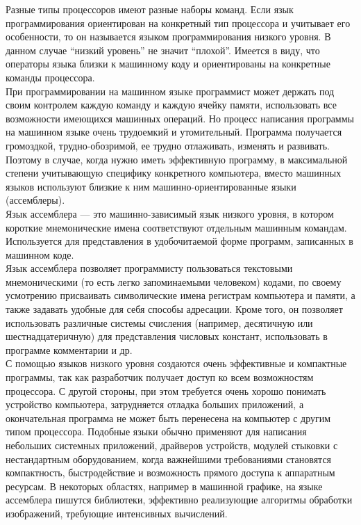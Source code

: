 Разные типы процессоров имеют разные наборы команд. Если язык программирования ориентирован на конкретный тип процессора и учитывает его особенности, то он называется языком программирования низкого уровня. В данном случае “низкий уровень” не значит “плохой”. Имеется в виду, что операторы языка близки к машинному коду и ориентированы на конкретные команды процессора. \\

При программировании на машинном языке программист может держать под своим контролем каждую команду и каждую ячейку памяти, использовать все возможности имеющихся машинных операций. Но процесс написания программы на машинном языке очень трудоемкий и утомительный. Программа получается громоздкой, трудно-обозримой, ее трудно отлаживать, изменять и развивать. \\

Поэтому в случае, когда нужно иметь эффективную программу, в максимальной степени учитывающую специфику конкретного компьютера, вместо машинных языков используют близкие к ним машинно-ориентированные языки (ассемблеры). \\

Язык ассемблера — это машинно-зависимый язык низкого уровня, в котором короткие мнемонические имена соответствуют отдельным машинным командам. Используется для представления в удобочитаемой форме программ, записанных в машинном коде. \\

Язык ассемблера позволяет программисту пользоваться текстовыми мнемоническими (то есть легко запоминаемыми человеком) кодами, по своему усмотрению присваивать символические имена регистрам компьютера и памяти, а также задавать удобные для себя способы адресации. Кроме того, он позволяет использовать различные системы счисления (например, десятичную или шестнадцатеричную) для представления числовых констант, использовать в программе комментарии и др. \\

С помощью языков низкого уровня создаются очень эффективные и компактные программы, так как разработчик получает доступ ко всем возможностям процессора. С другой стороны, при этом требуется очень хорошо понимать устройство компьютера, затрудняется отладка больших приложений, а окончательная программа не может быть перенесена на компьютер с другим типом процессора. Подобные языки обычно применяют для написания небольших системных приложений, драйверов устройств, модулей стыковки с нестандартным оборудованием, когда важнейшими требованиями становятся компактность, быстродействие и возможность прямого доступа к аппаратным ресурсам. В некоторых областях, например в машинной графике, на языке ассемблера пишутся библиотеки, эффективно реализующие алгоритмы обработки изображений, требующие интенсивных вычислений. \\


